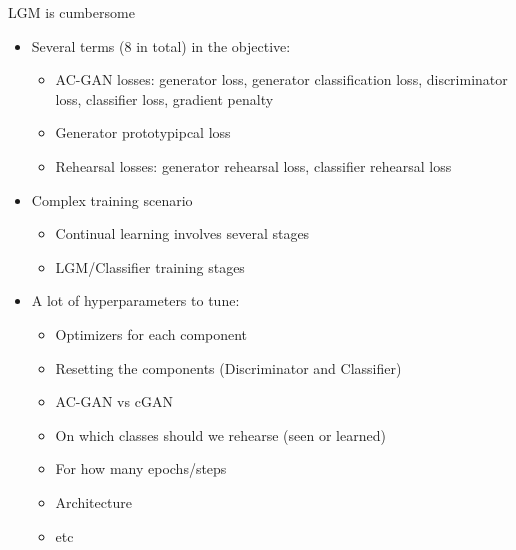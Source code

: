 \documentclass[10pt]{beamer}
\begin{document}
{
\begin{frame}{LGM is cumbersome}
\begin{itemize}
    \item\pause Several terms (8 in total) in the objective:
    \begin{itemize}
        \item\pause AC-GAN losses: generator loss, generator classification loss, discriminator loss, classifier loss, gradient penalty
        \item\pause Generator prototypipcal loss
        \item\pause Rehearsal losses: generator rehearsal loss, classifier rehearsal loss
    \end{itemize}
    
    \item\pause Complex training scenario
    \begin{itemize}
        \item Continual learning involves several stages
        \item LGM/Classifier training stages
    \end{itemize}
    
    \item A lot of hyperparameters to tune:
    \begin{itemize}
        \item\pause Optimizers for each component
        \item\pause Resetting the components (Discriminator and Classifier)
        \item\pause AC-GAN vs cGAN
        \item\pause On which classes should we rehearse (seen or learned)
        \item\pause For how many epochs/steps
        \item\pause Architecture
        \item\pause etc
    \end{itemize}
\end{itemize}
\end{frame}
}
\end{document}
